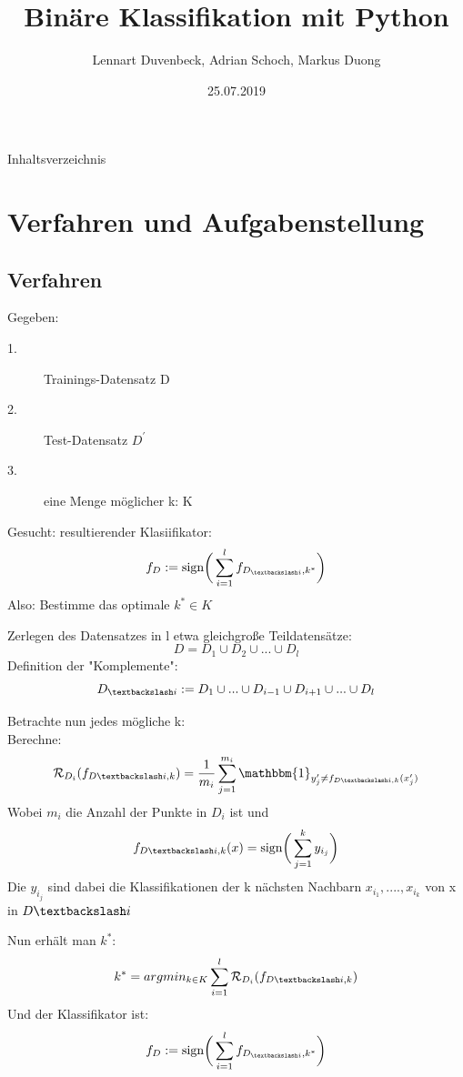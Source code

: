 \documentclass{beamer}
\title{Binäre Klassifikation mit Python}
\author{Lennart Duvenbeck, Adrian Schoch, Markus Duong}
\date{25.07.2019}
\begin{document}
\maketitle
\begin{frame}{Inhaltsverzeichnis}
  \tableofcontents
\end{frame}


\section{Verfahren und Aufgabenstellung}

\subsection{Verfahren}
\begin{frame}
Gegeben: 
\begin{description}
\item[1.] Trainings-Datensatz D
\item[2.] Test-Datensatz $D^{'}$
\item[3.] eine Menge möglicher k: K
\end{description}
Gesucht: resultierender Klasiifikator: 
\[
f_ {D} := \text{sign} \bigg( \sum_{i=1}^{l} f_{D_{\textbackslash i}, k^{*}}\bigg)
\]
Also: Bestimme das optimale $k^* \in K$
\end{frame}



\begin{frame}
Zerlegen des Datensatzes in l etwa gleichgroße Teildatensätze:
\[
D= D_1 \cup D_2 \cup ... \cup D_l
\]
Definition der "Komplemente":
\[
D_{\textbackslash i} := D_{1} \cup ... \cup D_{i-1} \cup D_{i+1} \cup...\cup D_{l}
\]
\end{frame}


\begin{frame}
Betrachte nun jedes mögliche k:\\
Berechne:
\[ \mathcal{R}_{D_i}(f_{D \textbackslash i ,k})= \frac{1}{m_i} \sum_{j=1}^{m_i} \mathbbm{1}_{y_{j}' \neq f_{D \textbackslash i ,k}(x_{j}')}
\]
Wobei $m_i$ die Anzahl der Punkte in $D_i$ ist und  
\[f_{D \textbackslash i ,k}(x) = \text{sign} \bigg( \sum_{j =1}^{k} y_{i_{j}}\bigg)
\]
Die $y_{i_j}$ sind dabei die Klassifikationen der k nächsten Nachbarn 
$x_{i_1},....,x_{i_k}$ von x in $D \textbackslash i$
\end{frame}

\begin{frame}
Nun erhält man $k^*$: 
\[k^* = argmin_{k \in K} \sum_{i=1}^l \mathcal{R}_{D_i}(f_{D \textbackslash i ,k})
\]
Und der Klassifikator ist:
\[f_ {D} := \text{sign} \bigg( \sum_{i=1}^{l} f_{D_{\textbackslash i}, k^{*}}\bigg)
\]
\end{frame}
\end{document}
